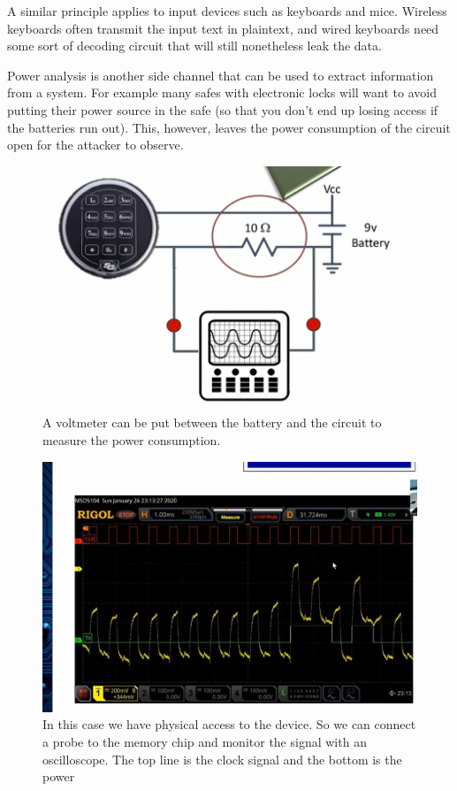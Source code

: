 \documentclass[../notes.tex]{subfiles}
\begin{document}
A similar principle applies to input devices such as keyboards and mice. Wireless keyboards often transmit the input text in plaintext, and wired keyboards need some sort of decoding circuit that will still nonetheless leak the data.


Power analysis is another side channel that can be used to extract information from a system.
For example many safes with electronic locks will want to avoid putting their power source in the safe (so that you don't end up losing access if the batteries run out). This, however, leaves the power consumption of the circuit open for the attacker to observe.

\begin{figure}[H]
    \centering
    \includegraphics[width=0.8\linewidth]{img/image_2023-03-28-15-49-15.png}
    \caption{A voltmeter can be put between the battery and the circuit to measure the power consumption.}
\end{figure}


\begin{figure}[H]
    \centering
    \includegraphics[width=0.8\linewidth]{img/image_2023-03-28-15-51-23.png}
    \caption{In this case we have physical access to the device. So we can connect a probe to the memory chip and monitor the signal with an oscilloscope. The top line is the clock signal and the bottom is the power}
\end{figure}
\end{document}
